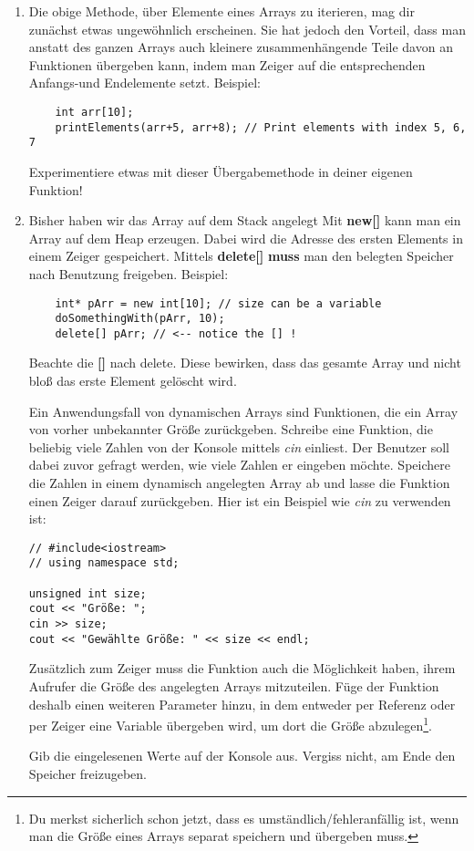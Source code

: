 \begin{enumerate}
\item 
Die obige Methode, über Elemente eines Arrays zu iterieren, mag dir zunächst etwas ungewöhnlich erscheinen.
Sie hat jedoch den Vorteil, dass man anstatt des ganzen Arrays auch kleinere zusammenhängende Teile davon an Funktionen übergeben kann, indem man Zeiger auf die entsprechenden Anfangs-und Endelemente setzt.
Beispiel:
\begin{lstlisting}
	int arr[10];
	printElements(arr+5, arr+8); // Print elements with index 5, 6, 7
\end{lstlisting}
Experimentiere etwas mit dieser Übergabemethode in deiner eigenen Funktion!

\item
Bisher haben wir das Array auf dem Stack angelegt
Mit \textbf{new[]} kann man ein Array auf dem Heap erzeugen.
Dabei wird die Adresse des ersten Elements in einem Zeiger gespeichert.
Mittels \textbf{delete[]} \textbf{muss} man den belegten Speicher nach Benutzung freigeben.
Beispiel:
\begin{lstlisting}
	int* pArr = new int[10]; // size can be a variable
	doSomethingWith(pArr, 10);
	delete[] pArr; // <-- notice the [] !
\end{lstlisting}
Beachte die \textbf{[]} nach delete.
Diese bewirken, dass das gesamte Array und nicht bloß das erste Element gelöscht wird.

Ein Anwendungsfall von dynamischen Arrays sind Funktionen, die ein Array von vorher unbekannter Größe zurückgeben.
Schreibe eine Funktion, die beliebig viele Zahlen von der Konsole mittels \emph{cin} einliest.
Der Benutzer soll dabei zuvor gefragt werden, wie viele Zahlen er eingeben möchte.
Speichere die Zahlen in einem dynamisch angelegten Array ab und lasse die Funktion einen Zeiger darauf zurückgeben.
Hier ist ein Beispiel wie \emph{cin} zu verwenden ist:
\begin{lstlisting}
// #include<iostream>
// using namespace std;

unsigned int size;
cout << "Größe: ";
cin >> size;
cout << "Gewählte Größe: " << size << endl;
\end{lstlisting}

Zusätzlich zum Zeiger muss die Funktion auch die Möglichkeit haben, ihrem Aufrufer die Größe des angelegten Arrays mitzuteilen.
Füge der Funktion deshalb einen weiteren Parameter hinzu, in dem entweder per Referenz oder per Zeiger eine Variable übergeben wird, um dort die Größe abzulegen\footnote{Du merkst sicherlich schon jetzt, dass es umständlich/fehleranfällig ist, wenn man die Größe eines Arrays separat speichern und übergeben muss.}. 

Gib die eingelesenen Werte auf der Konsole aus.
Vergiss nicht, am Ende den Speicher freizugeben.
\end{enumerate}

